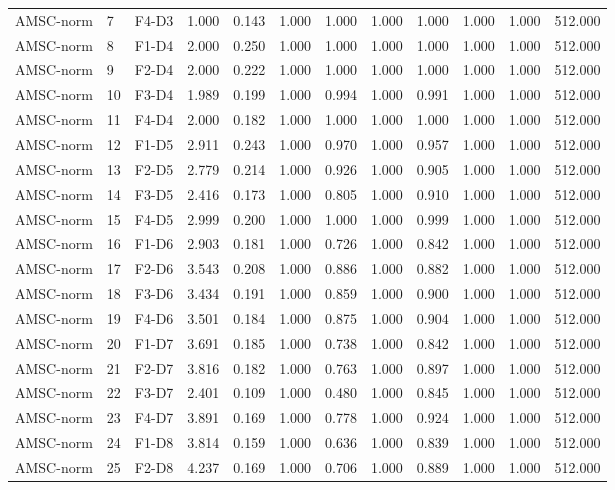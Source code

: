 \begin{table}[ht]
\begin{tabular}{lllrrrrrrrrr}
AMSC-norm & 7 & F4-D3 & 1.000 & 0.143 & 1.000 & 1.000 & 1.000 & 1.000 & 1.000 & 1.000 & 512.000 \\
AMSC-norm & 8 & F1-D4 & 2.000 & 0.250 & 1.000 & 1.000 & 1.000 & 1.000 & 1.000 & 1.000 & 512.000 \\
AMSC-norm & 9 & F2-D4 & 2.000 & 0.222 & 1.000 & 1.000 & 1.000 & 1.000 & 1.000 & 1.000 & 512.000 \\
AMSC-norm & 10 & F3-D4 & 1.989 & 0.199 & 1.000 & 0.994 & 1.000 & 0.991 & 1.000 & 1.000 & 512.000 \\
AMSC-norm & 11 & F4-D4 & 2.000 & 0.182 & 1.000 & 1.000 & 1.000 & 1.000 & 1.000 & 1.000 & 512.000 \\
AMSC-norm & 12 & F1-D5 & 2.911 & 0.243 & 1.000 & 0.970 & 1.000 & 0.957 & 1.000 & 1.000 & 512.000 \\
AMSC-norm & 13 & F2-D5 & 2.779 & 0.214 & 1.000 & 0.926 & 1.000 & 0.905 & 1.000 & 1.000 & 512.000 \\
AMSC-norm & 14 & F3-D5 & 2.416 & 0.173 & 1.000 & 0.805 & 1.000 & 0.910 & 1.000 & 1.000 & 512.000 \\
AMSC-norm & 15 & F4-D5 & 2.999 & 0.200 & 1.000 & 1.000 & 1.000 & 0.999 & 1.000 & 1.000 & 512.000 \\
AMSC-norm & 16 & F1-D6 & 2.903 & 0.181 & 1.000 & 0.726 & 1.000 & 0.842 & 1.000 & 1.000 & 512.000 \\
AMSC-norm & 17 & F2-D6 & 3.543 & 0.208 & 1.000 & 0.886 & 1.000 & 0.882 & 1.000 & 1.000 & 512.000 \\
AMSC-norm & 18 & F3-D6 & 3.434 & 0.191 & 1.000 & 0.859 & 1.000 & 0.900 & 1.000 & 1.000 & 512.000 \\
AMSC-norm & 19 & F4-D6 & 3.501 & 0.184 & 1.000 & 0.875 & 1.000 & 0.904 & 1.000 & 1.000 & 512.000 \\
AMSC-norm & 20 & F1-D7 & 3.691 & 0.185 & 1.000 & 0.738 & 1.000 & 0.842 & 1.000 & 1.000 & 512.000 \\
AMSC-norm & 21 & F2-D7 & 3.816 & 0.182 & 1.000 & 0.763 & 1.000 & 0.897 & 1.000 & 1.000 & 512.000 \\
AMSC-norm & 22 & F3-D7 & 2.401 & 0.109 & 1.000 & 0.480 & 1.000 & 0.845 & 1.000 & 1.000 & 512.000 \\
AMSC-norm & 23 & F4-D7 & 3.891 & 0.169 & 1.000 & 0.778 & 1.000 & 0.924 & 1.000 & 1.000 & 512.000 \\
AMSC-norm & 24 & F1-D8 & 3.814 & 0.159 & 1.000 & 0.636 & 1.000 & 0.839 & 1.000 & 1.000 & 512.000 \\
AMSC-norm & 25 & F2-D8 & 4.237 & 0.169 & 1.000 & 0.706 & 1.000 & 0.889 & 1.000 & 1.000 & 512.000 \\

\end{tabular}
\end{table}
